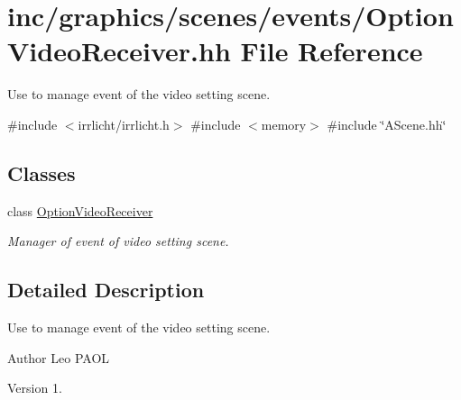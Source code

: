 \hypertarget{OptionVideoReceiver_8hh}{}\section{inc/graphics/scenes/events/\+Option\+Video\+Receiver.hh File Reference}
\label{OptionVideoReceiver_8hh}


Use to manage event of the video setting scene.  


{\ttfamily \#include $<$irrlicht/irrlicht.\+h$>$}\newline
{\ttfamily \#include $<$memory$>$}\newline
{\ttfamily \#include \char`\"{}A\+Scene.\+hh\char`\"{}}\newline
\subsection*{Classes}
\begin{DoxyCompactItemize}
\item 
class \hyperlink{classOptionVideoReceiver}{Option\+Video\+Receiver}
\begin{DoxyCompactList}\small\item\em Manager of event of video setting scene. \end{DoxyCompactList}\end{DoxyCompactItemize}


\subsection{Detailed Description}
Use to manage event of the video setting scene. 

\begin{DoxyAuthor}{Author}
Leo P\+A\+OL 
\end{DoxyAuthor}
\begin{DoxyVersion}{Version}
1. 
\end{DoxyVersion}
